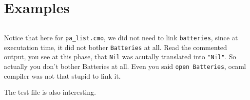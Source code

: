 \section{Examples}


\inputminted[fontsize=\scriptsize, ]{ocaml}{camlp4/example/pa_list.ml}


Notice that here for \verb|pa_list.cmo|, we did not need to link
\verb|batteries|, since at executation time, it did not bother
\verb|Batteries| at all. Read the commented output, you see at this
phase, that \verb|Nil| was acutally translated into \verb|"Nil"|. So
actually you don't bother Batteries at all. Even you said
\verb|open Batteries|, ocaml compiler was not that stupid to link it.


The test file is also interesting.
\inputminted[fontsize=\scriptsize, ]{ocaml}{camlp4/example/test_pa_list.ml}
